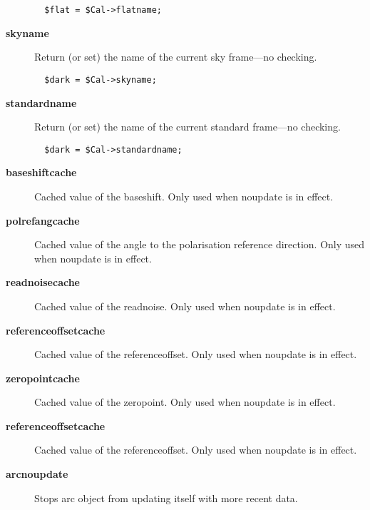 \begin{description}
\begin{verbatim}
  $flat = $Cal->flatname;
\end{verbatim}

\item[{\textbf{skyname}}] \mbox{}

Return (or set) the name of the current sky frame---no checking.

\begin{verbatim}
  $dark = $Cal->skyname;
\end{verbatim}

\item[{\textbf{standardname}}] \mbox{}

Return (or set) the name of the current standard frame---no checking.

\begin{verbatim}
  $dark = $Cal->standardname;
\end{verbatim}

\item[{\textbf{baseshiftcache}}] \mbox{}

Cached value of the baseshift.  Only used when noupdate is in effect.


\item[{\textbf{polrefangcache}}] \mbox{}

Cached value of the angle to the polarisation reference direction.  Only
used when noupdate is in effect.


\item[{\textbf{readnoisecache}}] \mbox{}

Cached value of the readnoise.  Only used when noupdate is in effect.


\item[{\textbf{referenceoffsetcache}}] \mbox{}

Cached value of the referenceoffset.  Only used when noupdate is in effect.


\item[{\textbf{zeropointcache}}] \mbox{}

Cached value of the zeropoint.  Only used when noupdate is in effect.


\item[{\textbf{referenceoffsetcache}}] \mbox{}

Cached value of the referenceoffset.  Only used when noupdate is in effect.


\item[{\textbf{arcnoupdate}}] \mbox{}

Stops arc object from updating itself with more recent data.




\end{description}
